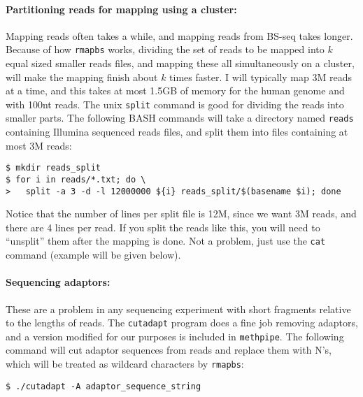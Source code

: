 \documentclass[10pt]{article}
\newcommand{\meth}{\texttt{methpipe}}
\newcommand{\prog}[1]{\texttt{#1}}
\newcommand{\fn}[1]{\texttt{#1}}
\begin{document}
\paragraph{Partitioning reads for mapping using a cluster:} Mapping
reads often takes a while, and mapping reads from BS-seq takes longer.
Because of how \prog{rmapbs} works, dividing the set of reads to be
mapped into $k$ equal sized smaller reads files, and mapping these all
simultaneously on a cluster, will make the mapping finish about $k$
times faster. I will typically map 3M reads at a time, and this takes
at most 1.5GB of memory for the human genome and with 100nt reads. The
unix \prog{split} command is good for dividing the reads into smaller
parts. The following BASH commands will take a directory named
\fn{reads} containing Illumina sequenced reads files, and split
them into files containing at most 3M reads:
\begin{verbatim}
$ mkdir reads_split
$ for i in reads/*.txt; do \
>   split -a 3 -d -l 12000000 ${i} reads_split/$(basename $i); done
\end{verbatim}
Notice that the number of lines per split file is 12M, since we want
3M reads, and there are 4 lines per read. If you split the reads like
this, you will need to ``unsplit'' them after the mapping is done. Not
a problem, just use the \prog{cat} command (example will be given
below).

\paragraph{Sequencing adaptors:}
These are a problem in any sequencing experiment with short fragments
relative to the lengths of reads.  The \prog{cutadapt} program does a
fine job removing adaptors, and a version modified for our purposes
is included in \meth{}.  The following command will cut adaptor sequences
from reads and replace them with N's, which will be treated as wildcard
characters by \prog{rmapbs}:
\begin{verbatim}
$ ./cutadapt -A adaptor_sequence_string
\end{verbatim}



\end{document}
